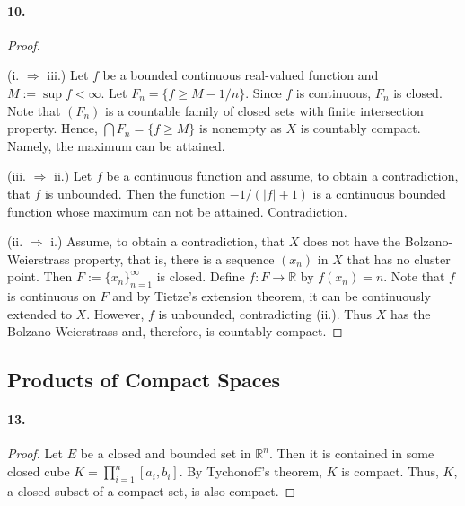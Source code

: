 \paragraph{10.}
\begin{proof}
  $\,$\par
  (i. $\Rightarrow$ iii.) Let $f$ be a bounded continuous real-valued function
  and $M := \sup f < \infty$. Let $F_n = \{f \ge M - 1/n\}$. Since $f$ is
  continuous, $F_n$ is closed. Note that $(F_n)$ is a countable family of
  closed sets with finite intersection property. Hence, $\bigcap F_n =
  \{f \ge M\}$ is nonempty as $X$ is countably compact. Namely, the maximum
  can be attained. 
  
  (iii. $\Rightarrow$ ii.) Let $f$ be a continuous function and assume, to
  obtain a contradiction, that $f$ is unbounded. Then the function 
  $-1/(|f| + 1)$ is a continuous bounded function whose maximum can not be 
  attained. Contradiction.
  
  (ii. $\Rightarrow$ i.) Assume, to obtain a contradiction, that $X$ does not
  have the Bolzano-Weierstrass property, that is, there is a sequence $(x_n)$
  in $X$ that has no cluster point. Then $F := \{x_n\}_{n=1}^\infty$ is closed.
  Define $f: F \to \mathbb{R}$ by $f(x_n) = n$. Note that $f$ is continuous on
  $F$ and by Tietze's extension theorem, it can be continuously extended to 
  $X$. However, $f$ is unbounded, contradicting (ii.). Thus $X$ has the
  Bolzano-Weierstrass and, therefore, is countably compact. 
\end{proof}

\subsection{Products of Compact Spaces}
\paragraph{13.}
\begin{proof}
  Let $E$ be a closed and bounded set in $\mathbb{R}^n$. Then it is contained
  in some closed cube $K = \prod_{i=1}^n[a_i, b_i]$. By Tychonoff's theorem,
  $K$ is compact. Thus, $K$, a closed subset of a compact set, is also compact.
\end{proof}

